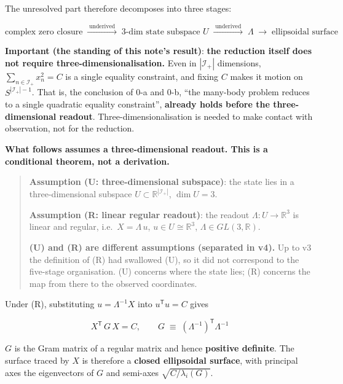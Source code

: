 \documentclass[
  10pt,
]{article}
\begin{document}
The unresolved part therefore decomposes into three stages:

\[\text{complex zero closure} \;\xrightarrow{\;\text{underived}\;}\; \text{3-dim state subspace }U \;\xrightarrow{\;\text{underived}\;}\; \Lambda \;\longrightarrow\; \text{ellipsoidal surface}\]

\textbf{Important (the standing of this note's result)}: \textbf{the
reduction itself does not require three-dimensionalisation.} Even in
\(|\mathcal{I}_+|\) dimensions, \(\sum_{n\in \mathcal{I}_+}x_n^2 = C\)
is a single equality constraint, and fixing \(C\) makes it motion on
\(S^{|\mathcal{I}_+|-1}\). That is, the conclusion of 0-a and 0-b, ``the
many-body problem reduces to a single quadratic equality constraint'',
\textbf{already holds before the three-dimensional readout}.
Three-dimensionalisation is needed to make contact with observation, not
for the reduction.

\textbf{What follows assumes a three-dimensional readout. This is a
conditional theorem, not a derivation.}

\begin{quote}
\textbf{Assumption (U: three-dimensional subspace)}: the state lies in a
three-dimensional subspace \(U \subset \mathbb{R}^{|\mathcal{I}_+|}\),
\(\dim U = 3\).

\textbf{Assumption (R: linear regular readout)}: the readout
\(\Lambda : U \to \mathbb{R}^3\) is linear and regular,
i.e.~\(X = \Lambda\,u\), \(u \in U \cong \mathbb{R}^3\),
\(\Lambda \in GL(3,\mathbb{R})\).

\textbf{(U) and (R) are different assumptions (separated in v4).} Up to
v3 the definition of (R) had swallowed (U), so it did not correspond to
the five-stage organisation. (U) concerns where the state lies; (R)
concerns the map from there to the observed coordinates.
\end{quote}

Under (R), substituting \(u = \Lambda^{-1}X\) into
\(u^{\mathsf T}u = C\) gives

\[X^{\mathsf T}\,G\,X = C, \qquad G \;\equiv\; (\Lambda^{-1})^{\mathsf T}\Lambda^{-1}\]

\(G\) is the Gram matrix of a regular matrix and hence \textbf{positive
definite}. The surface traced by \(X\) is therefore a \textbf{closed
ellipsoidal surface}, with principal axes the eigenvectors of \(G\) and
semi-axes \(\sqrt{C/\lambda_i(G)}\).
\end{document}
